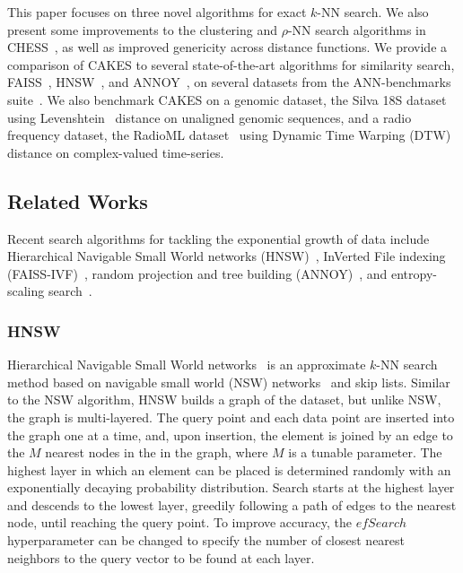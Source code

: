 This paper focuses on three novel algorithms for exact $k$-NN search.
We also present some improvements to the clustering and $\rho$-NN search algorithms in CHESS~\cite{ishaq2019clustered}, as well as improved genericity across distance functions.
We provide a comparison of CAKES to several state-of-the-art algorithms for similarity search, FAISS~\cite{johnson2019billion}, HNSW~\cite{malkov2016hnsw}, and ANNOY~\cite{annoy}, on several datasets from the ANN-benchmarks suite~\cite{aumuller2020ann}.
We also benchmark CAKES on a genomic dataset, the Silva 18S dataset~\cite{10.1093/nar/gks1219} using Levenshtein~\cite{levenshtein1966binary} distance on unaligned genomic sequences, and a radio frequency dataset, the RadioML dataset~\cite{oshea2018radioml} using Dynamic Time Warping (DTW)~\cite{gold2018dynamic} distance on complex-valued time-series.


\subsection{Related Works}
\label{sec:intoduction:related-works}

Recent search algorithms for tackling the exponential growth of data include Hierarchical Navigable Small World networks (HNSW)~\cite{Malkov2016EfficientAR}, InVerted File indexing (FAISS-IVF)~\cite{faissivf}, random projection and tree building (ANNOY)~\cite{annoy}, and entropy-scaling search~\cite{yu2015entropy, ishaq2019clustered}.


\subsubsection{HNSW}
\label{sec:introduction:related-works:hnsw}

Hierarchical Navigable Small World networks~\cite{Malkov2016EfficientAR} is an approximate $k$-NN search method based on navigable small world (NSW) networks~\cite{kleinberg2000navigation, boguna2009navigability} and skip lists. 
Similar to the NSW algorithm, HNSW builds a graph of the dataset, but unlike NSW, the graph is multi-layered.
The query point and each data point are inserted into the graph one at a time, and, upon insertion, the element is joined by an edge to the $M$ nearest nodes in the in the graph, where $M$ is a tunable parameter. 
The highest layer in which an element can be placed is determined randomly with an exponentially decaying probability distribution.
Search starts at the highest layer and descends to the lowest layer, greedily following a path of edges to the nearest node, until reaching the query point. 
To improve accuracy, the $efSearch$ hyperparameter can be changed to specify the number of closest nearest neighbors to the query vector to be found at each layer. 


